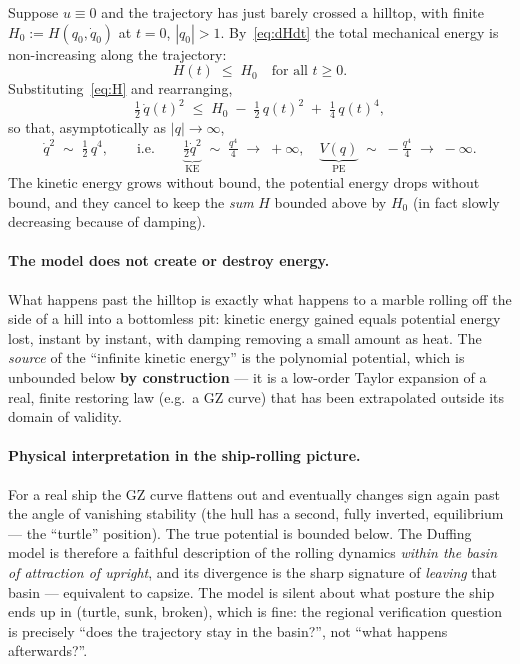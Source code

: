 \documentclass[11pt]{article}
\begin{document}
Suppose $u\equiv 0$ and the trajectory has just barely crossed a
hilltop, with finite $H_0 := H(q_0, \dot q_0)$ at $t=0$,
$|q_0| > 1$. By~\eqref{eq:dHdt} the total mechanical energy is
non-increasing along the trajectory:
\begin{equation}
H(t) \;\le\; H_0 \quad\text{for all } t \ge 0.
\label{eq:Hbound}
\end{equation}
Substituting~\eqref{eq:H} and rearranging,
\begin{equation}
\tfrac{1}{2}\,\dot q(t)^2
  \;\le\;
  H_0 \;-\; \tfrac{1}{2}\,q(t)^2 \;+\; \tfrac{1}{4}\,q(t)^4,
\end{equation}
so that, asymptotically as $|q|\to\infty$,
\begin{equation}
\dot q^2 \;\sim\; \tfrac{1}{2}\,q^4,
\qquad
\text{i.e.}\qquad
\underbrace{\tfrac{1}{2}\dot q^2}_{\text{KE}}
  \;\sim\; \tfrac{q^4}{4}
  \;\to\; +\infty,
\quad
\underbrace{V(q)}_{\text{PE}}
  \;\sim\; -\tfrac{q^4}{4}
  \;\to\; -\infty.
\label{eq:asymp}
\end{equation}
The kinetic energy grows without bound, the potential energy drops
without bound, and they cancel to keep the {\itshape sum} $H$
bounded above by $H_0$ (in fact slowly decreasing because of damping).

\paragraph{The model does not create or destroy energy.}
What happens past the hilltop is exactly what happens to a marble
rolling off the side of a hill into a bottomless pit: kinetic energy
gained equals potential energy lost, instant by instant, with damping
removing a small amount as heat. The {\itshape source} of the
``infinite kinetic energy'' is the polynomial potential, which is
unbounded below {\bfseries by construction} --- it is a low-order
Taylor expansion of a real, finite restoring law (e.g.\ a GZ curve)
that has been extrapolated outside its domain of validity.

\paragraph{Physical interpretation in the ship-rolling picture.}
For a real ship the GZ curve flattens out and eventually changes sign
again past the angle of vanishing stability (the hull has a second,
fully inverted, equilibrium --- the ``turtle'' position). The true
potential is bounded below. The Duffing model is therefore a faithful
description of the rolling dynamics {\itshape within the basin of
attraction of upright}, and its divergence is the sharp signature of
\emph{leaving} that basin --- equivalent to capsize. The model is
silent about what posture the ship ends up in (turtle, sunk, broken),
which is fine: the regional verification question is precisely
``does the trajectory stay in the basin?'', not ``what happens
afterwards?''.
\end{document}
